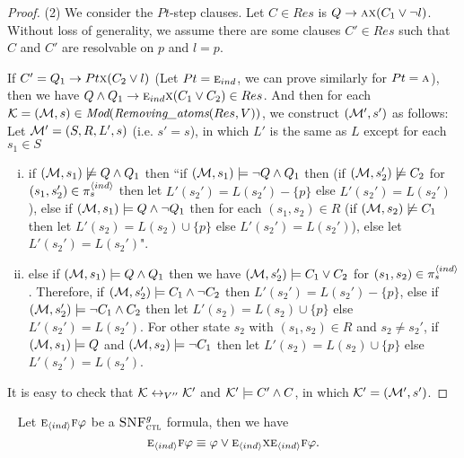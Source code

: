 \documentclass[twoside,11pt]{article}
\begin{document}
\begin{proof}
		(2) We consider the $Pt$-step clauses. Let $C\in Res$ is $Q \rightarrow \textsc{a} \textsc{x}(C_1 \vee \neg l)$. Without loss of generality, we assume there are some clauses $C'\in Res$ such that $C$ and $C'$ are resolvable on $p$ and $l=p$.
		
		If $C'= Q_1\rightarrow Pt \textsc{x} (C_2 \vee l)$ (Let $Pt=\textsc{e}_{ind}$, we can prove similarly for $Pt = \textsc{a}$), then we have $Q \wedge Q_1 \rightarrow \textsc{e}_{ind} \textsc{x}(C_1 \vee C_2) \in Res$. And then for each ${\cal K}=({\cal M}, s)\in \textit{Mod}(\emph{Removing\_atoms}(Res, V))$, we construct $({\cal M}',s')$ as follows: Let ${\cal M}'= (S, R, L',s)$ (i.e. $s'=s$), in which $L'$ is the same as $L$ except for each $s_1\in S$
		\begin{enumerate}[(i)]
			\item if $({\cal M}, s_1) \not \models Q \wedge Q_1$ then ``if $({\cal M}, s_1) \models \neg Q \wedge Q_1$ then (if $({\cal M}, s_2') \not \models C_2$ for $(s_1, s_2') \in \pi_s^{{\langle{ind}\rangle}}$ then let $L'(s_2') = L(s_2') - \{p\}$ else $L'(s_2') = L(s_2')$), else if $({\cal M}, s_1) \models Q \wedge \neg Q_1$ then for each $(s_1, s_2) \in R$ (if $({\cal M}, s_2) \not \models C_1$ then let $L'(s_2) = L(s_2) \cup \{p\}$ else $L'(s_2') = L(s_2')$), else let $L'(s_2') = L(s_2')$".
			\item else if $({\cal M}, s_1) \models Q \wedge Q_1$ then we have $({\cal M},s_2') \models C_1 \vee C_2$ for $(s_1, s_2) \in \pi_s^{{\langle{ind}\rangle}}$. Therefore, if $({\cal M}, s_2') \models C_1 \wedge \neg C_2$ then $L'(s_2') = L(s_2') - \{p\}$, else if  $({\cal M}, s_2') \models \neg C_1 \wedge C_2$ then let $L'(s_2) = L(s_2) \cup \{p\}$ else $L'(s_2') = L(s_2')$. For other state $s_2$ with $(s_1, s_2) \in R$ and $s_2 \not = s_2'$, if $({\cal M}, s_1) \models Q$ and $({\cal M}, s_2) \models \neg C_1$ then let $L'(s_2) = L(s_2) \cup \{p\}$ else $L'(s_2') = L(s_2')$.
		\end{enumerate}
		It is easy to check that ${\cal K} \leftrightarrow_{V''} {\cal K}'$ and ${\cal K}' \models C' \wedge C$, in which ${\cal K}' = ({\cal M}',s')$.
	\end{proof}
	
	
	
	\noindent\begin{lemma}~\label{lem:Ind:EF}
		Let $\textsc{e}_{{\langle{ind}\rangle}} \textsc{f} \varphi$ be a ${\textsc{SNF}_{\textsc{ctl}}^g}$ formula, then we have
		\[
		\textsc{e}_{{\langle{ind}\rangle}} \textsc{f} \varphi \equiv \varphi \vee \textsc{e}_{{\langle{ind}\rangle}} \textsc{x} \textsc{e}_{{\langle{ind}\rangle}}\textsc{f} \varphi.
		\]
	\end{lemma}
	
\end{document}
